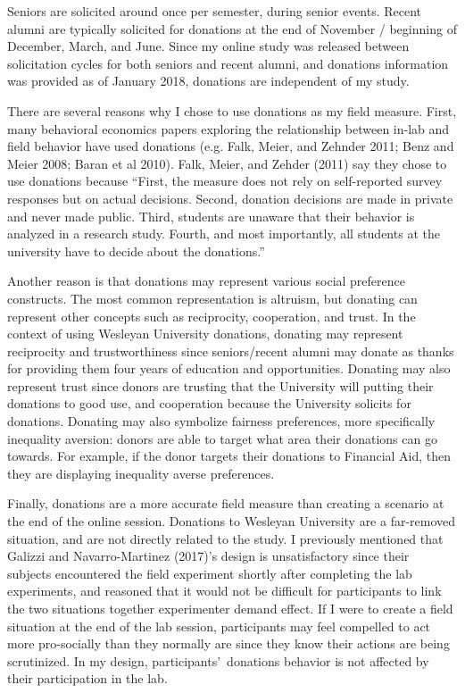\documentclass[12pt]{article}
\begin{document}
Seniors are solicited around once per semester, during senior events. Recent alumni are typically solicited for donations at the end of November / beginning of December, March, and June. Since my online study was released between solicitation cycles for both seniors and recent alumni, and donations information was provided as of January 2018, donations are {\color{red}independent of my study}. 

There are several reasons why I chose to use donations as my field measure. First, many behavioral economics papers exploring the relationship between in-lab and field behavior have used donations (e.g. Falk, Meier, and Zehnder 2011; Benz and Meier 2008; Baran et al 2010). Falk, Meier, and Zehder (2011) say they chose to use donations because {\color{blue}``First, the measure does not rely on self-reported survey responses but on actual decisions. Second, donation decisions are made in private and never made public. Third, students are unaware that their behavior is analyzed in a research study. Fourth, and most importantly, all students at the university have to decide about the donations.''}

{\color{blue}Another reason is that donations may represent various social preference constructs. The most common representation is altruism, but donating can represent other concepts such as reciprocity, cooperation, and trust. In the context of using Wesleyan University donations, donating may represent reciprocity and trustworthiness since seniors/recent alumni may donate as thanks for providing them four years of education and opportunities. Donating may also represent trust since donors are trusting that the University will putting their donations to good use, and cooperation because the University solicits for donations. Donating may also symbolize fairness preferences, more specifically inequality aversion: donors are able to target what area their donations can go towards. For example, if the donor targets their donations to Financial Aid, then they are displaying inequality averse preferences.}

Finally, donations are a more accurate field measure than creating a scenario at the end of the online session. Donations to Wesleyan University are a far-removed situation, and are not directly related to the study. I previously mentioned that Galizzi and Navarro-Martinez (2017)\rq s design is unsatisfactory since their subjects encountered the field experiment shortly after completing the lab experiments, and reasoned that it would not be difficult for participants to link the two situations together {\color{red} experimenter demand effect}. If I were to create a field situation at the end of the lab session, participants may feel compelled to act more pro-socially than they normally are since they know their actions are being scrutinized. In my design, participants\rq \ donations behavior is not affected by their participation in the lab.
\end{document}
